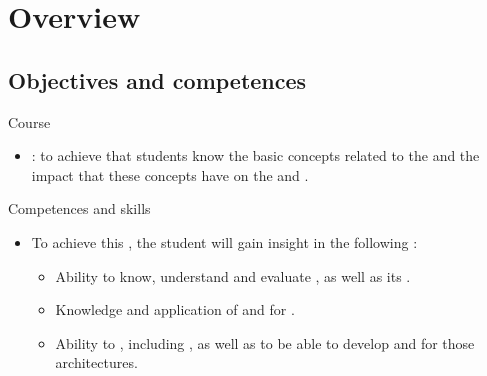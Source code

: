 \section{Overview}

\subsection{Objectives and competences}

\begin{frame}[t]{Course}
\begin{itemize}
  \item {}: to achieve that students know the basic concepts related
to the  and the impact that these concepts have on the
 and .

\end{itemize}
\end{frame}

\begin{frame}[t]{Competences and skills}
\begin{itemize}
  \item To achieve this , the student will gain insight in the following :
    \begin{itemize}
      \item Ability to know, understand and evaluate 
            , 
            as well as its .

      \item Knowledge and application of 
             and  for 
            .

      \item Ability to  , 
            including , 
            as well as to be able to develop and  
            for those architectures.
    \end{itemize}
\end{itemize}
\end{frame}

